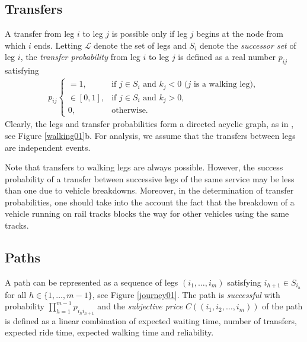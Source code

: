 \documentclass[dissertation,draft*]{aaltoseries}
\begin{document}
\subsection{Transfers}
A transfer from leg $i$ to leg $j$ is possible only if leg $j$ begins at the node from which $i$ ends.
Letting $\mathcal{L}$ denote the set of legs and $S_i$ denote the 
\emph{successor set} of leg $i$,
the \emph{transfer probability} from leg $i$ to leg $j$ is defined as a real number $p_{ij}$ satisfying
\begin{align}
\label{transferprob}
p_{ij}
\left\{
\begin{array}{ll}
= 1, & \mbox{if $j \in S_{i}$ and $k_j < 0$ \ \ ($j$ is a walking leg)}, \\
\in [0,1], & \mbox{if $j \in S_{i}$ and $k_j > 0$}, \\ %
0, & \mbox{otherwise.}
\end{array}
\right.
\end{align}
Clearly, the legs and transfer probabilities
form a directed acyclic graph, as in \cite{psaraftis93}, see Figure \ref{walking01}b. 
For analysis, we assume that the transfers between legs are independent events.

Note that transfers to walking legs are always possible. However, the success probability 
of a transfer between successive legs of the same service may be less than one due to vehicle breakdowns.
Moreover, in the determination of transfer probabilities,
one should take into the account the fact that the breakdown of a vehicle running on rail tracks blocks the way for
other vehicles using the same tracks.


\subsection{Paths}
A path can be represented as a sequence of legs $(i_1,\ldots,i_m)$ satisfying
$i_{h+1} \in S_{i_h}$ for all $h \in \{1,\ldots,m-1\}$, see Figure \ref{journey01}. 
The path is \emph{successful} with probability $\prod_{h=1}^{m-1}p_{i_hi_{h+1}}$ and the \emph{subjective price} $C \left( (i_1,i_2,\ldots,i_m) \right)$  of
the path is defined as a linear combination of expected waiting time, number of transfers, expected ride time, expected walking time and reliability. 
\end{document}

